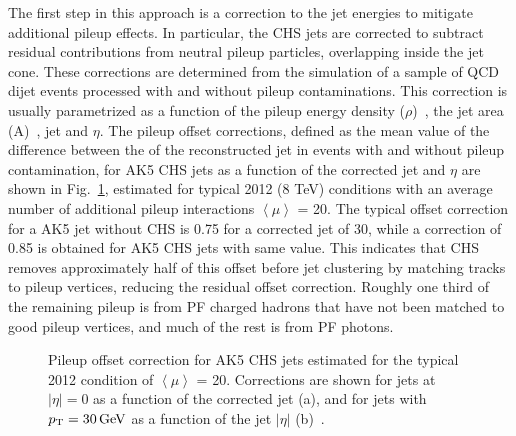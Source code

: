 The first step in this approach is a correction to the jet energies to mitigate additional pileup effects. 
In particular, the CHS jets are corrected to subtract residual contributions from neutral pileup particles, overlapping inside the jet cone. These corrections are determined from the simulation of a sample of QCD dijet events processed with and without pileup contaminations. This correction is usually parametrized as a function of the pileup energy density ($\rho$)~\cite{Cacciari:2011ma,Cacciari:2005hq}, the jet area (A)~\cite{Cacciari:2007fd}, jet \pt and $\eta$. The pileup offset corrections, defined as the mean value of the difference between the \pt of the reconstructed jet in events with and without pileup contamination, for AK5 CHS jets as a function of the corrected jet \pt and $\eta$ are shown in Fig.~\ref{fig:pucorr_ak5chs}, estimated for typical 2012 (8 TeV) conditions with an average number of additional pileup interactions $\left\langle\mu\right\rangle$ = 20.
The typical offset correction for a AK5 jet without CHS is 0.75 for a corrected jet \pt of 30\GeV, while a correction of 0.85 is obtained for AK5 CHS jets with same \pt value. This indicates that CHS removes approximately half of this offset before jet clustering by matching tracks to pileup vertices, reducing the residual offset correction. Roughly one third of the remaining pileup is from PF charged hadrons that have not been matched to good pileup vertices, and much of the rest is from PF photons. 

\begin{figure}[!htb]
\centering
{}
\caption{Pileup offset correction for AK5 CHS jets estimated for the typical 2012 condition of $\left\langle\mu\right\rangle$ = 20. Corrections are shown for jets at $|\eta| = 0$ as a function of the corrected jet \pt (a), and for jets with $p_{\mathrm{T}} = 30\,\text{Ge\hspace{-.08em}V}$ as a function of the jet $|\eta|$ (b)~\cite{Khachatryan:2016kdb}.}
\label{fig:pucorr_ak5chs}
\end{figure}

